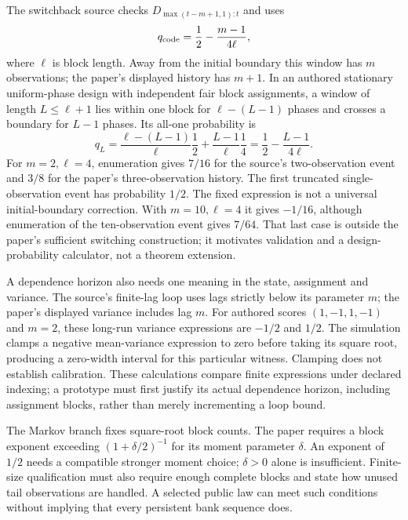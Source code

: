 The switchback source checks $D_{\max(t-m+1,1):t}$ and uses
\[
 q_{\rm code}=\frac12-\frac{m-1}{4\ell},
\]
where $\ell$ is block length. Away from the initial boundary this window has
$m$ observations; the paper's displayed history has $m+1$. In an authored
stationary uniform-phase design with independent fair block assignments, a
window of length $L\leq\ell+1$ lies within one block for $\ell-(L-1)$ phases
and crosses a boundary for $L-1$ phases. Its all-one probability is
\[
 q_L=\frac{\ell-(L-1)}{\ell}\frac12+
       \frac{L-1}{\ell}\frac14
     =\frac12-\frac{L-1}{4\ell}.
\]
For $m=2,\ell=4$, enumeration gives $7/16$ for the source's two-observation
event and $3/8$ for the paper's three-observation history. The first truncated
single-observation event has probability $1/2$. The fixed expression is not
a universal initial-boundary correction. With $m=10,\ell=4$ it gives
$-1/16$, although enumeration of the ten-observation event gives $7/64$.
That last case is outside the paper's sufficient switching construction; it
motivates validation and a design-probability calculator, not a theorem
extension.~\citep{exec25_onet_dml,exec25_onet_paper,exec25_onet_choice}

A dependence horizon also needs one meaning in the state, assignment and
variance. The source's finite-lag loop uses lags strictly below its parameter
$m$; the paper's displayed variance includes lag $m$. For authored scores
$(1,-1,1,-1)$ and $m=2$, these long-run variance expressions are $-1/2$ and
$1/2$. The simulation clamps a negative mean-variance expression to zero
before taking its square root, producing a zero-width interval for this
particular witness. Clamping does not establish calibration. These calculations
compare finite expressions under declared indexing; a prototype must first
justify its actual dependence horizon, including assignment blocks, rather
than merely incrementing a loop bound.
\citep{exec25_onet_dml,exec25_onet_paper,exec25_onet_choice}

The Markov branch fixes square-root block counts. The paper requires a block
exponent exceeding $(1+\delta/2)^{-1}$ for its moment parameter $\delta$.
An exponent of $1/2$ needs a compatible stronger moment choice; $\delta>0$
alone is insufficient. Finite-size qualification must also require enough
complete blocks and state how unused tail observations are handled. A selected
public law can meet such conditions without implying that every persistent
bank sequence does.~\citep{exec25_onet_dml,exec25_onet_paper}

